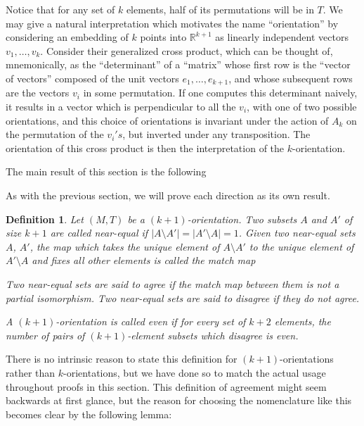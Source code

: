 \documentclass{amsart}
\newtheorem{definition}[theorem]{Definition}
\begin{document}
Notice that for any set of $k$ elements, half of its permutations will be in $T$. We may give a natural interpretation which motivates the name ``orientation'' by considering an embedding of $k$ points into $\mathbb{R}^{k+1}$ as linearly independent vectors $v_1, \dots, v_k$. Consider their generalized cross product, which can be thought of, mnemonically, as the ``determinant'' of a ``matrix'' whose first row is the ``vector of vectors'' composed of the unit vectors $e_1, \dots, e_{k+1}$, and whose subsequent rows are the vectors $v_i$ in some permutation. If one computes this determinant naively, it results in a vector which is perpendicular to all the $v_i$, with one of two possible orientations, and this choice of orientations is invariant under the action of $A_k$ on the permutation of the $v_i's$, but inverted under any transposition. The orientation of this cross product is then the interpretation of the $k$-orientation.

The main result of this section is the following

\maintheoremtwo*
As with the previous section, we will prove each direction as its own result.


\begin{definition}
    Let $(M, T)$ be a $(k+1)$-orientation. Two subsets $A$ and $A'$ of size $k+1$ are called \emph{near-equal} if $|A \setminus A'| = |A'\setminus A| = 1$. Given two near-equal sets $A$, $A'$, the map which takes the unique element of $A \setminus A'$ to the unique element of $A' \setminus A$ and fixes all other elements is called the \emph{match map}
    
     Two near-equal sets are said to \emph{agree} if the match map between them is \emph{not} a partial isomorphism. Two near-equal sets are said to \emph{disagree} if they do not agree.
    
    A $(k+1)$-orientation is called \emph{even} if for every set of $k+2$ elements, the number of pairs of $(k+1)$-element subsets which disagree is even.
\end{definition}

There is no intrinsic reason to state this definition for $(k+1)$-orientations rather than $k$-orientations, but we have done so to match the actual usage throughout proofs in this section. This definition of agreement might seem backwards at first glance, but the reason for choosing the nomenclature like this becomes clear by the following lemma:
\end{document}
